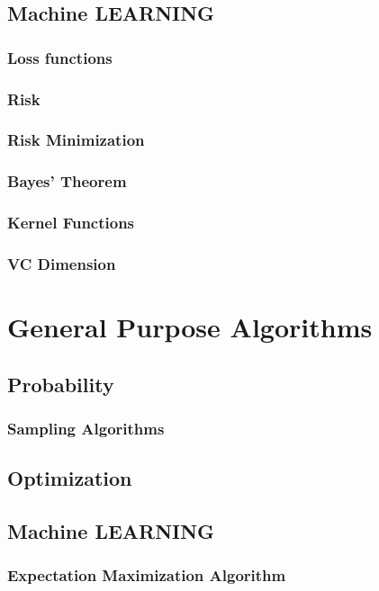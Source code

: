 \documentclass{book}
\begin{document}
\section{Machine LEARNING}
\subsection{Loss functions}
\subsection{Risk}
\subsection{Risk Minimization}
\subsection{Bayes' Theorem}
\subsection{Kernel Functions}
\subsection{VC Dimension}


\chapter{General Purpose Algorithms}
\section{Probability}
\subsection{Sampling Algorithms}
\section{Optimization}
\section{Machine LEARNING}
\subsection{Expectation Maximization Algorithm}
\end{document}
